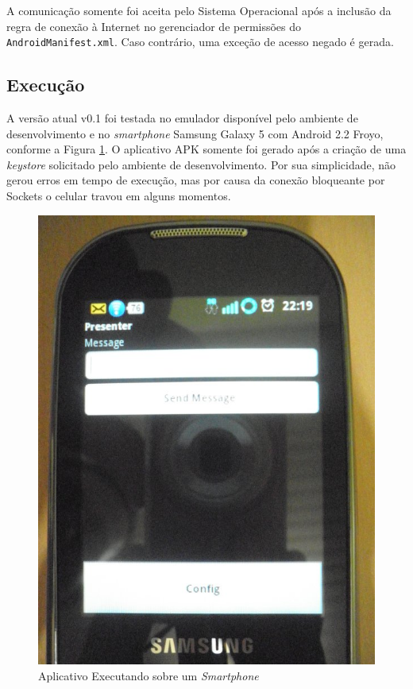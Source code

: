 \documentclass{article}
\begin{document}
A comunicação somente foi aceita pelo Sistema Operacional após a inclusão da
regra de conexão à Internet no gerenciador de permissões do
\texttt{AndroidManifest.xml}. Caso contrário, uma exceção de acesso negado é
gerada.

\subsection{Execução}

A versão atual v0.1 foi testada no emulador disponível pelo ambiente de
desenvolvimento e no \emph{smartphone} Samsung Galaxy 5 com Android 2.2
Froyo, conforme a Figura \ref{fig:smart}. O aplicativo APK somente foi gerado
após a criação de uma \emph{keystore} solicitado pelo ambiente de
desenvolvimento. Por sua simplicidade, não gerou erros em tempo de execução, mas
por causa da conexão bloqueante por Sockets o celular travou em alguns momentos.

\begin{figure}
    \centering{}
    \includegraphics[scale=0.3]{screenshot04-smart.jpg}
    \caption{Aplicativo Executando sobre um \emph{Smartphone}}
    \label{fig:smart}
\end{figure}
\end{document}
